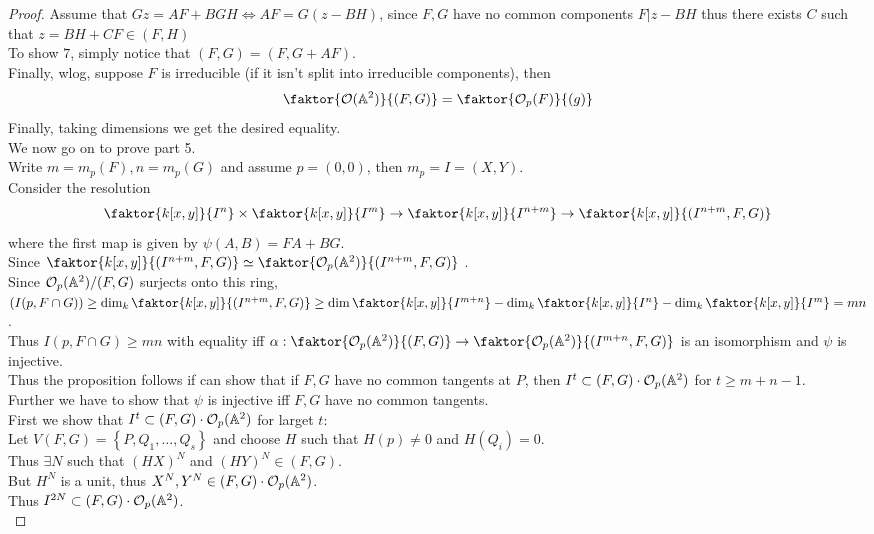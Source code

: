 \documentclass[../main.tex]{subfiles}
\begin{document}
\begin{proof}
Assume that $Gz= AF + BGH \iff AF= G( z-BH) $, since $F,G$ have no common components $F| z-BH$ thus there exists $C$ such that $z= BH+CF\in( F,H) $ \\
To show $7$, simply notice that $( F,G) = ( F,G+AF) $.\\
Finally, wlog, suppose $F$ is irreducible (if it isn't split into irreducible components), then
\[ 
\faktor{\O( \mathbb{A}^{2}) }{( F,G) }= \faktor{\O_p( F) }{( g) }
\]
Finally, taking dimensions we get the desired equality.\\
We now go on to prove part 5.\\
Write $m= m_p( F) , n=m_p( G) $ and assume $p= ( 0,0) $, then $m_p = I = ( X,Y) $.\\
Consider the resolution
\[ 
	\faktor{ k[x,y]}{I^{n}}\times \faktor{ k[x,y]}{I^{m}}\to \faktor{ k[x,y]}{I^{n+m}}\to \faktor{k[x,y]}{( I^{n+m},F,G) }
\]
where the first map is given by $\psi( A,B) = FA+BG$.\\
Since $ \faktor{k[x,y]}{( I^{n+m},F,G) }\simeq \faktor{\O_p( \mathbb{A}^{2}) }{( I^{n+m},F,G) }$ .\\
Since $\mathcal{O}_p( \mathbb{A}^{2}) /( F,G) $ surjects onto this ring, $( I( p,F\cap G) ) \geq \dim_k \faktor{k[x,y]}{( I^{n+m},F,G) } \geq  \dim \faktor{k[x,y]}{I^{m+n}} - \dim_{k}  \faktor{k[x,y]}{ I^{n}}- \dim_k \faktor{k[x,y]}{I^{m}}= mn	$.\\
Thus $I( p,F\cap G) \geq mn$ with equality iff $\alpha: \faktor{ \O_p( \mathbb{A}^{2}) }{( F,G) }	\to \faktor{\O_p( \mathbb{A}^{2}) }{( I^{m+n},F,G) }$ is an isomorphism and $\psi$ is injective.\\
Thus the proposition follows if can show  that if $F,G$ have no common tangents at $P$, then $I^{t}\subset ( F,G) \cdot \mathcal{O}_p( \mathbb{A}^{2}) $ for $t \geq m+n-1$.\\
Further we have to show that $ \psi$ is injective iff $F,G$ have no common tangents.\\
First we show that $I^{t}\subset ( F,G) \cdot \mathcal{O}_p( \mathbb{A}^{2}) $ for larget $t$:\\
Let $V( F,G) = \left\{ P, Q_1,\ldots,Q_s \right\} $ and choose $H$ such that $H( p) \neq 0$ and $H( Q_i) =0$.\\
Thus $\exists N$ such that $( HX)^{N}$ and $( HY) ^{N}\in ( F,G) $.\\
But $H^{N}$ is a unit, thus $X^{N},Y^{N}\in( F,G) \cdot \mathcal{O}_p( \mathbb{A}^{2}) $.\\
Thus $I^{2N}\subset ( F,G) \cdot \mathcal{O}_p( \mathbb{A}^{2}) $.\\

\end{proof}
\end{document}

